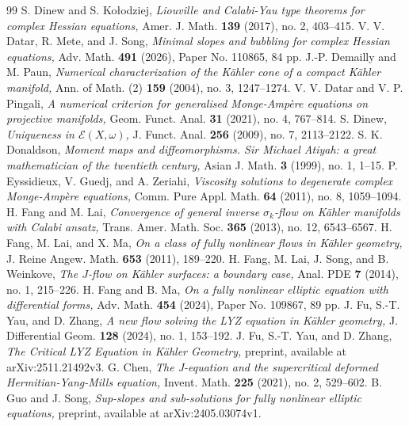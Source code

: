 \documentclass[10pt,a4paper]{amsart}
\numberwithin{equation}{section}
\begin{document}
\begin{thebibliography}{99}
 S. Dinew and S. Kołodziej, \textit{Liouville and Calabi-Yau type theorems for complex Hessian equations,} Amer. J. Math. \textbf{139} (2017), no. 2, 403--415.
 V. V. Datar, R. Mete, and J. Song, \textit{Minimal slopes and bubbling for complex Hessian equations,} Adv. Math. \textbf{491} (2026), Paper No. 110865, 84 pp.
 J.-P. Demailly and M. Paun, \textit{Numerical characterization of the K{\"a}hler cone of a compact K{\"a}hler manifold,} Ann. of Math. (2) \textbf{159} (2004), no. 3, 1247--1274.
 V. V. Datar and V. P. Pingali, \textit{A numerical criterion for generalised Monge-Ampère equations on projective manifolds,} Geom. Funct. Anal. \textbf{31} (2021), no. 4, 767--814.
 S. Dinew, \textit{Uniqueness in $\mathscr E(X,\omega)$,} J. Funct. Anal. \textbf{256} (2009), no. 7, 2113--2122.
 S. K. Donaldson, \textit{Moment maps and diffeomorphisms. Sir Michael Atiyah: a great mathematician of the twentieth century,} Asian J. Math. \textbf{3} (1999), no. 1, 1--15.
 P. Eyssidieux, V. Guedj, and A. Zeriahi, \textit{Viscosity solutions to degenerate complex Monge-Amp{\`e}re equations,} Comm. Pure Appl. Math. \textbf{64} (2011), no. 8, 1059--1094.
 H. Fang and M. Lai, \textit{Convergence of general inverse $\sigma_k$-flow on Kähler manifolds with Calabi ansatz,} Trans. Amer. Math. Soc. \textbf{365} (2013), no. 12, 6543--6567.
 H. Fang, M. Lai, and X. Ma, \textit{On a class of fully nonlinear flows in K{\"a}hler geometry,} J. Reine Angew. Math. \textbf{653} (2011), 189--220.
 H. Fang, M. Lai, J. Song, and B. Weinkove, \textit{The $J$-flow on Kähler surfaces: a boundary case,} Anal. PDE \textbf{7} (2014), no. 1, 215--226.
 H. Fang and B. Ma, \textit{On a fully nonlinear elliptic equation with differential forms,} Adv. Math. {\bf 454} (2024), Paper No. 109867, 89 pp.
 J. Fu, S.-T. Yau, and D. Zhang, \textit{A new flow solving the LYZ equation in Kähler geometry,} J. Differential Geom. \textbf{128} (2024), no. 1, 153--192.
 J. Fu, S.-T. Yau, and D. Zhang, \textit{The Critical LYZ Equation in Kähler Geometry,} preprint, available at arXiv:2511.21492v3.
 G. Chen, \textit{The J-equation and the supercritical deformed Hermitian-Yang-Mills equation,} Invent. Math. \textbf{225} (2021), no. 2, 529--602.
 B. Guo and J. Song, \textit{Sup-slopes and sub-solutions for fully nonlinear elliptic equations,} preprint, available at arXiv:2405.03074v1.

\end{thebibliography}
\end{document}
